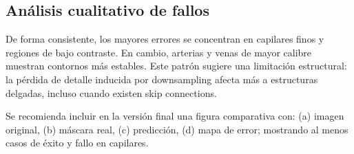 \subsection{Análisis cualitativo de fallos}
De forma consistente, los mayores errores se concentran en capilares finos y regiones de bajo contraste. En cambio, arterias y venas de mayor calibre muestran contornos más estables. Este patrón sugiere una limitación estructural: la pérdida de detalle inducida por downsampling afecta más a estructuras delgadas, incluso cuando existen skip connections.

Se recomienda incluir en la versión final una figura comparativa con: (a) imagen original, (b) máscara real, (c) predicción, (d) mapa de error; mostrando al menos casos de éxito y fallo en capilares.
